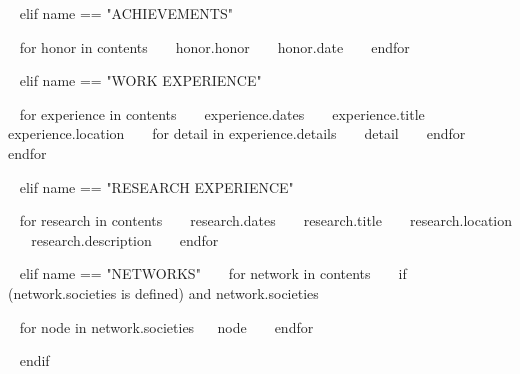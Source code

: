 \begin{minipage}{\textwidth}

~{ elif name == "ACHIEVEMENTS" }~
\begin{entrylist}[.1]
  ~{ for honor in contents }~
  \awardentry
    {~{{ honor.honor }}~}
    {~{{ honor.date }}~}
  ~{ endfor }~
\end{entrylist}



~{ elif name == "WORK EXPERIENCE" }~
\begin{entrylist}
~{ for experience in contents }~
  \entry
    {~{{ experience.dates }}~}
    {~{{ experience.title }}~}
    {~{{ experience.location }}~}
    {~{ for detail in experience.details }~ ~{{ detail }}~ ~{ endfor }~}
~{ endfor }~
\end{entrylist}
  


~{ elif name == "RESEARCH EXPERIENCE" }~
\begin{entrylist}
~{ for research in contents }~
  \entry
    {~{{ research.dates }}~}
    {~{{ research.title }}~}
    {~{{ research.location }}~}
    {~{{ research.description }}~}
~{ endfor }~
\end{entrylist}


~{ elif name == "NETWORKS" }~
~{ for network in contents }~
  ~{ if (network.societies is defined) and network.societies }~
  \begin{entrylist}[.1]
    ~{ for node in network.societies}~
     \networkentry
      {}
      {~{{ node }}~}
    ~{ endfor }~
  \end{entrylist}
  ~{ endif }~


\end{minipage}
